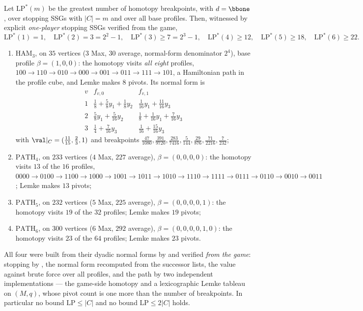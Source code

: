 \begin{proposition}\label{fsa:witnesses}
Let $\mathrm{LP}^{\ast}(m)$ be the greatest number of homotopy breakpoints,
with $d=\bbone$, over stopping SSGs with $|C|=m$ and over all base profiles.
Then, witnessed by explicit \emph{one-player} stopping SSGs verified from the
game,
\[
  \mathrm{LP}^{\ast}(1)=1,\quad \mathrm{LP}^{\ast}(2)=3=2^{2}-1,\quad
  \mathrm{LP}^{\ast}(3)\ge7=2^{3}-1,\quad
  \mathrm{LP}^{\ast}(4)\ge12,\quad \mathrm{LP}^{\ast}(5)\ge18,\quad
  \mathrm{LP}^{\ast}(6)\ge22 .
\]
\begin{enumerate}[label=(\alph*),leftmargin=2.2em]
\item $\mathrm{HAM}_3$, on $35$ vertices ($3$ Max, $30$ average, normal-form
  denominator $2^{4}$), base profile $\beta=(1,0,0)$: the homotopy visits
  \emph{all eight} profiles,
  $100\to110\to010\to000\to001\to011\to111\to101$, a Hamiltonian path in the
  profile cube, and Lemke makes $8$ pivots. Its normal form is
  \[
  \begin{array}{l|ll}
   v & f_{v,0} & f_{v,1}\\\hline
   1 & \tfrac18+\tfrac58y_1+\tfrac18y_2 & \tfrac1{16}y_1+\tfrac{11}{16}y_3\\
   2 & \tfrac58y_1+\tfrac5{16}y_2 & \tfrac18+\tfrac1{16}y_1+\tfrac7{16}y_3\\
   3 & \tfrac14+\tfrac7{16}y_3 & \tfrac1{16}+\tfrac{15}{16}y_3
  \end{array}
  \]
  with $\val|_C=(\tfrac{11}{15},\tfrac23,1)$ and breakpoints
  $\tfrac{47}{1080},\tfrac{391}{9720},\tfrac{283}{7416},\tfrac5{144},
   \tfrac{29}{876},\tfrac{71}{2216},\tfrac7{232}$;
\item $\mathrm{PATH}_4$, on $233$ vertices ($4$ Max, $227$ average),
  $\beta=(0,0,0,0)$: the homotopy visits $13$ of the $16$ profiles,
  $0000\to0100\to1100\to1000\to1001\to1011\to1010\to1110\to1111\to0111\to
  0110\to0010\to0011$; Lemke makes $13$ pivots;
\item $\mathrm{PATH}_5$, on $232$ vertices ($5$ Max, $225$ average),
  $\beta=(0,0,0,0,1)$: the homotopy visits $19$ of the $32$ profiles; Lemke
  makes $19$ pivots;
\item $\mathrm{PATH}_6$, on $300$ vertices ($6$ Max, $292$ average),
  $\beta=(0,0,0,0,1,0)$: the homotopy visits $23$ of the $64$ profiles; Lemke
  makes $23$ pivots.
\end{enumerate}
All four were built from their dyadic normal forms by 
and verified \emph{from the game}: stopping by , the normal
form recomputed from the successor lists, the value against brute force over
all profiles, and the path by two independent implementations --- the
game-side homotopy and a lexicographic Lemke tableau on $(M,q)$, whose pivot
count is one more than the number of breakpoints. In particular no bound
$\mathrm{LP}\le|C|$ and no bound $\mathrm{LP}\le2|C|$ holds.
\end{proposition}

